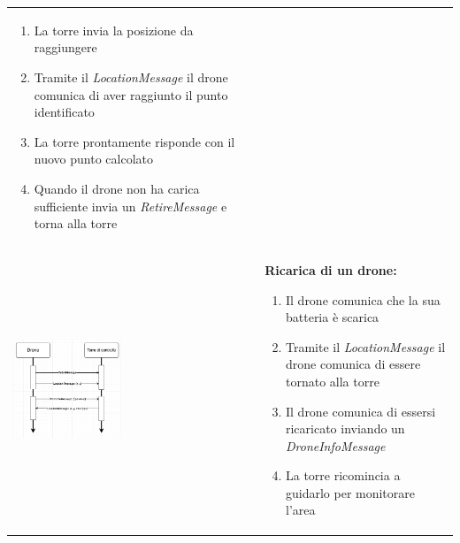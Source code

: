 \documentclass[a4paper, 11pt]{article}
\begin{document}
\begin{tabular}{m{} p{}}
    \begin{enumerate}
        \item La torre invia la posizione da raggiungere
        \item Tramite il \textit{LocationMessage} il drone comunica di aver raggiunto il punto identificato
        \item La torre prontamente risponde con il nuovo punto calcolato
        \item Quando il drone non ha carica sufficiente invia un \textit{RetireMessage} e torna alla torre
    \end{enumerate}\\
    \includegraphics[width=0.45\textwidth]{image/rechargingUML_MSC.png}&\textbf{Ricarica di un drone:}
    \begin{enumerate}
        \item Il drone comunica che la sua batteria è scarica 
        \item Tramite il \textit{LocationMessage} il drone comunica di essere tornato alla torre 
        \item Il drone comunica di essersi ricaricato inviando un \textit{DroneInfoMessage}
        \item La torre ricomincia a guidarlo per monitorare l'area
    \end{enumerate}

\end{tabular}
\newpage
\end{document}

